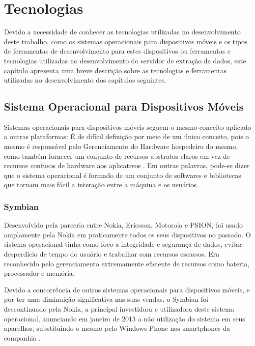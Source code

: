 
\chapter{Tecnologias}
Devido a necessidade de conhecer as tecnologias utilizadas no desenvolvimento deste trabalho, como os sistemas operacionais para dispositivos móveis e os tipos de ferramentas de desenvolvimento para estes dispositivos ou ferramentas e tecnologias utilizadas no desenvolvimento do servidor de extração de dados, este capítulo apresenta uma breve descrição sobre as tecnologias e ferramentas utilizadas no desenvolvimento dos capítulos seguintes.

\section{Sistema Operacional para Dispositivos Móveis}
Sistemas operacionais para dispositivos móveis seguem o mesmo conceito aplicado a outras plataformas: É de difícil definição por meio de um único conceito, pois o mesmo é responsável pelo Gerenciamento do Hardware hospedeiro do mesmo, como também fornecer um conjunto de recursos abstratos claros em vez de recursos confusos de hardware aos aplicativos \cite{tanenbaum2010modern}. Em outras palavras, pode-se dizer que o sistema operacional é formado de um conjunto de softwares e bibliotecas que tornam mais fácil a interação entre a máquina e os usuários.

\subsection{Symbian}
Desenvolvido pela parceria entre Nokia, Ericsson, Motorola e PSION, foi usado amplamente pela Nokia em praticamente todos os seus dispositivos no passado. O sistema operacional tinha como foco a integridade e segurança de dados, evitar desperdício de tempo do usuário e trabalhar com recursos escassos. Era reconhecido pelo gerenciamento extremamente eficiente de recursos como bateria, processador e memória\cite{SistemasOperacionaisMoveisComputacao}.

Devido a concorrência de outros sistemas operacionais para dispositivos móveis, e por ter uma diminuição significativa nas suas vendas, o Symbian foi descontinuado pela Nokia, a principal investidora e utilizadora deste sistema operacional, anunciando em janeiro de 2013 a não utilização do sistema em seus aparelhos, substituindo o mesmo pelo Windows Phone nos smartphones da companhia \cite{NokiaSymbian}.

